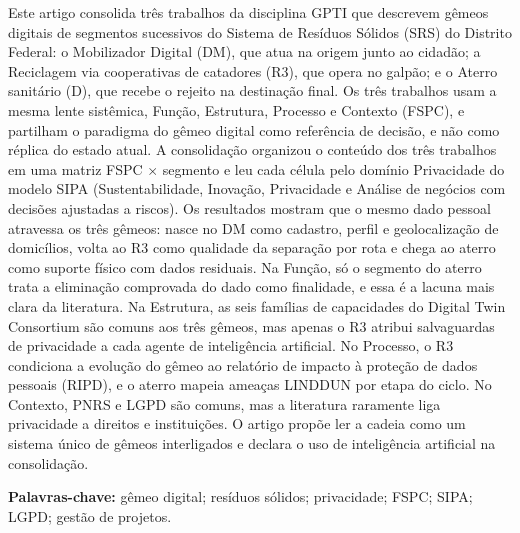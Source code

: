 \documentclass[12pt,a4paper,article,oneside,english,brazil]{abntex2}
\begin{document}
\begin{resumo}
Este artigo consolida três trabalhos da disciplina GPTI que descrevem gêmeos digitais de segmentos sucessivos do Sistema de Resíduos Sólidos (SRS) do Distrito Federal: o Mobilizador Digital (DM), que atua na origem junto ao cidadão; a Reciclagem via cooperativas de catadores (R3), que opera no galpão; e o Aterro sanitário (D), que recebe o rejeito na destinação final. Os três trabalhos usam a mesma lente sistêmica, Função, Estrutura, Processo e Contexto (FSPC), e partilham o paradigma do gêmeo digital como referência de decisão, e não como réplica do estado atual. A consolidação organizou o conteúdo dos três trabalhos em uma matriz FSPC $\times$ segmento e leu cada célula pelo domínio Privacidade do modelo SIPA (Sustentabilidade, Inovação, Privacidade e Análise de negócios com decisões ajustadas a riscos). Os resultados mostram que o mesmo dado pessoal atravessa os três gêmeos: nasce no DM como cadastro, perfil e geolocalização de domicílios, volta ao R3 como qualidade da separação por rota e chega ao aterro como suporte físico com dados residuais. Na Função, só o segmento do aterro trata a eliminação comprovada do dado como finalidade, e essa é a lacuna mais clara da literatura. Na Estrutura, as seis famílias de capacidades do Digital Twin Consortium são comuns aos três gêmeos, mas apenas o R3 atribui salvaguardas de privacidade a cada agente de inteligência artificial. No Processo, o R3 condiciona a evolução do gêmeo ao relatório de impacto à proteção de dados pessoais (RIPD), e o aterro mapeia ameaças LINDDUN por etapa do ciclo. No Contexto, PNRS e LGPD são comuns, mas a literatura raramente liga privacidade a direitos e instituições. O artigo propõe ler a cadeia como um sistema único de gêmeos interligados e declara o uso de inteligência artificial na consolidação.

\vspace{\onelineskip}
\noindent\textbf{Palavras-chave:} gêmeo digital; resíduos sólidos; privacidade; FSPC; SIPA; LGPD; gestão de projetos.
\end{resumo}
\end{document}
